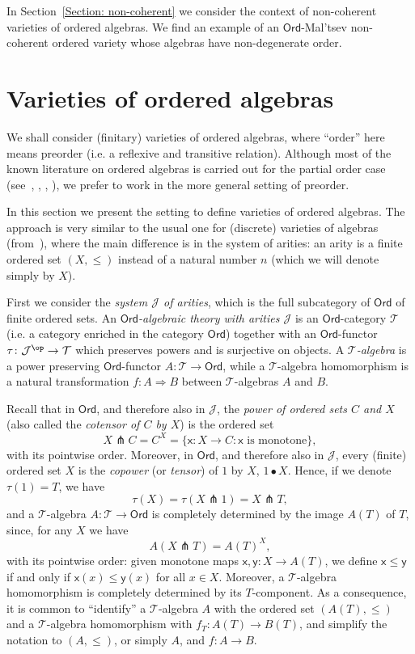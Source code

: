 \documentclass[11pt]{amsart}
\theoremstyle{plain}
\theoremstyle{definition}
\theoremstyle{remark}
\newcommand{\To}{\Rightarrow}
\newcommand{\Ord}{\ensuremath{\mathsf{Ord}}}
\def\xx{\mathsf{x}}
\def\yy{\mathsf{y}}
\newcommand{\J}{\ensuremath{\mathcal{J}}}
\newcommand{\T}{\ensuremath{\mathcal{T}}}
\begin{document}
In Section~\ref{Section: non-coherent} we consider the context of non-coherent varieties of ordered algebras. We find an example of an $\Ord$-Mal'tsev non-coherent ordered variety whose algebras have non-degenerate order.


\section{Varieties of ordered algebras}\label{Vars of ordered algs}

We shall consider (finitary) varieties of ordered algebras, where ``order'' here means preorder (i.e. a reflexive and transitive relation). Although most of the known literature on ordered algebras is carried out for the partial order case (see~\cite{Adamek-Milius}, \cite{NPower}, \cite{PPower}, \cite{Power}), we prefer to work in the more general setting of preorder.

In this section we present the setting to define varieties of ordered algebras. The approach is very similar to the usual one for (discrete) varieties of algebras (from~\cite{Lawvere}), where the main difference is in the system of arities: an arity is a finite ordered set $(X,\le)$ instead of a natural number $n$ (which we will denote simply by $X$).

First we consider the \emph{system $\J$ of arities}, which is the full subcategory of $\Ord$ of finite ordered sets.
 An \emph{$\Ord$-algebraic theory with arities $\J$} is an $\Ord$-category $\T$ (i.e. a category enriched in the category $\Ord$) together with an $\Ord$-functor $\tau\colon \J^\op \to \T$ which preserves powers and is surjective on objects. A \emph{$\T$-algebra} is a power preserving $\Ord$-functor $A\colon \T \to \Ord$, while a $\T$-algebra homomorphism is a natural transformation $f:A\To B$ between $\T$-algebras $A$ and $B$.

 Recall that in $\Ord$, and therefore also in $\J$, the \emph{power of ordered sets $C$ and $ X$} (also called the \emph{cotensor of $C$ by $X$}) is the ordered set \[X\pitchfork C=C^X=\{\xx\colon X\to C: \xx\text{ is monotone}\},\]
with its pointwise order. Moreover, in $\Ord$, and therefore also in $\J$, every (finite) ordered set $X$ is the \emph{copower} (or \emph{tensor}) of $1$ by $X$, $1\bullet X$.
Hence, if we denote $\tau(1)= T$, we
  have
  \[\tau(X)=\tau(X\pitchfork 1)=X\pitchfork T,\]
  and a $\T$-algebra $A\colon\T\to\Ord$ is completely determined by the image $A(T)$ of $T$, since, for any $X$ we have
  \[A(X\pitchfork T)=A(T)^X,\]
  with its pointwise order: given monotone maps $\xx,\yy\colon X \to A(T)$, we define $\xx\le \yy$ if and only if $\xx(x)\le \yy(x)$ for all $x\in X$. Moreover, a $\T$-algebra homomorphism is completely determined by its $T$-component. As a consequence, it is common to ``identify''  a $\T$-algebra $A$ with the ordered set  $(A(T), \le)$ and a $\T$-algebra homomorphism with $f_T\colon A(T)\to B(T)$, and simplify the notation to $(A,\le)$, or simply $A$, and $f\colon A\to B$.
\end{document}
